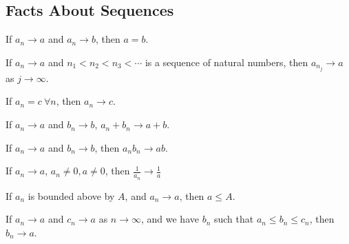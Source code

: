 \documentclass[../Main.tex]{subfiles}
\begin{document}
\subsection{Facts About Sequences}
\begin{propositions}{
        \label{propsSequenceFacts}
    }
    \item If $a_n \rightarrow a$ and $a_n \rightarrow b$, then $a = b$. \label{propLimitUnique}
    \item If $a_n \rightarrow a$ and $n_1 < n_2 < n_3 < \cdots$ is a sequence of natural numbers, then $a_{n_j} \rightarrow a$ as $j \rightarrow \infty$. \label{propSubsequenceLimit}
    \item If $a_n = c~\forall n$, then $a_n \rightarrow c$.\label{propConstantLimit}
    \item If $a_n \rightarrow a$ and $b_n \rightarrow b$, $a_n + b_n \rightarrow a + b$.\label{propSumOfSequences}
    \item If $a_n \rightarrow a$ and $b_n \rightarrow b$, then $a_n b_n \rightarrow ab$.\label{propProductOfSequences}
    \item If $a_n \rightarrow a$, $a_n \neq 0, a \neq 0$, then $\frac{1}{a_n} \rightarrow \frac{1}{a}$ \label{propReciprocalSequence}
    \item If $a_n$ is bounded above by $A$, and $a_n \rightarrow a$, then $a \leq A$.\label{propBoundedLimit}
    \item If $a_n \rightarrow a$ and $c_n \rightarrow a$ as $n \rightarrow \infty$, and we have $b_n$ such that $a_n \leq b_n \leq c_n$, then $b_n \rightarrow a$. \label{propSequenceSandwich}
\end{propositions}
\end{document}
